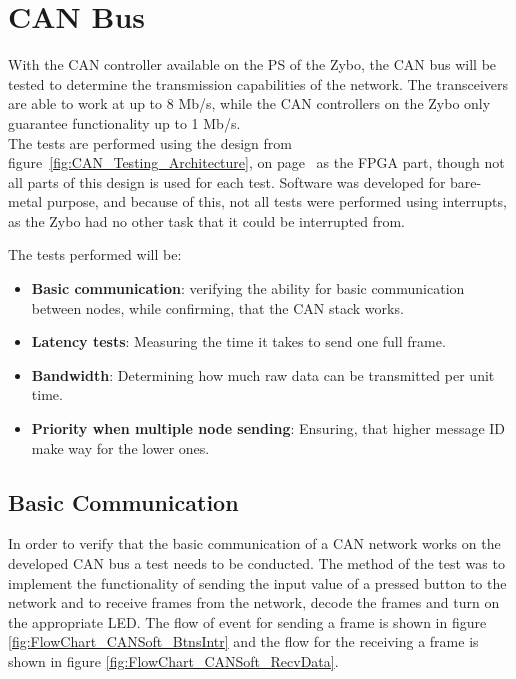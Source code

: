 
\section{CAN Bus}
\label{sub:CAN_Bus_Tests}
With the CAN controller available on the PS of the Zybo, the CAN bus will be tested to determine the transmission capabilities of the network.
The transceivers are able to work at up to 8 Mb/s, while the CAN controllers on the Zybo only guarantee functionality up to 1 Mb/s. \\

The tests are performed using the design from figure~\ref{fig:CAN_Testing_Architecture}, on page~\pageref{fig:CAN_Testing_Architecture} as the FPGA part, though not all parts of this design is used for each test.
Software was developed for bare-metal purpose, and because of this, not all tests were performed using interrupts, as the Zybo had no other task that it could be interrupted from.

The tests performed will be: 
\begin{itemize}
	\item \textbf{Basic communication}: verifying the ability for basic communication between nodes, while confirming, that the CAN stack works.
	\item \textbf{Latency tests}: Measuring the time it takes to send one full frame.
	\item \textbf{Bandwidth}: Determining how much raw data can be transmitted per unit time.
	\item \textbf{Priority when multiple node sending}: Ensuring, that higher message ID make way for the lower ones.
\end{itemize}

\subsection{Basic Communication}
\label{sub:TestingCANStack_BareMetal}

In order to verify that the basic communication of a CAN network works on the developed CAN bus a test needs to be conducted.
The method of the test was to implement the functionality of sending the input value of a pressed button to the network and to receive frames from the network, decode the frames and turn on the appropriate LED.
The flow of event for sending a frame is shown in figure \ref{fig:FlowChart_CANSoft_BtnsIntr} and the flow for the receiving a frame is shown in figure \ref{fig:FlowChart_CANSoft_RecvData}.

